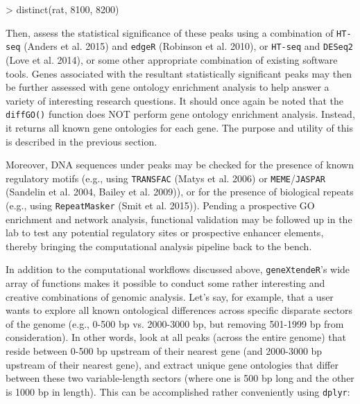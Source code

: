 \documentclass[12pt]{article}
\begin{document}
\begin{Schunk}
\begin{Sinput}
> distinct(rat, 8100, 8200)
\end{Sinput}
\end{Schunk}

Then, assess the statistical significance of these peaks using a combination of \texttt{HT-seq} (Anders et al. 2015) and \texttt{edgeR} (Robinson et al. 2010), or \texttt{HT-seq} and \texttt{DESeq2} (Love et al. 2014), or some other appropriate combination of existing software tools.  Genes associated with the resultant statistically significant peaks may then be further assessed with gene ontology enrichment analysis to help answer a variety of interesting research questions.  It should once again be noted that the \texttt{diffGO()} function does NOT perform gene ontology enrichment analysis.  Instead, it returns all known gene ontologies for each gene.  The purpose and utility of this is described in the previous section.

Moreover, DNA sequences under peaks may be checked for the presence of known regulatory motifs (e.g., using \texttt{TRANSFAC} (Matys et al. 2006) or \texttt{MEME}/\texttt{JASPAR} (Sandelin et al. 2004, Bailey et al. 2009)), or for the presence of biological repeats (e.g., using \texttt{RepeatMasker} (Smit et al. 2015)). Pending a prospective GO enrichment and network analysis, functional validation may be followed up in the lab to test any potential regulatory sites or prospective enhancer elements, thereby bringing the computational analysis pipeline back to the bench.

In addition to the computational workflows discussed above, \texttt{geneXtendeR}'s wide array of functions makes it possible to conduct some rather interesting and creative combinations of genomic analysis.  Let's say, for example, that a user wants to explore all known ontological differences across specific disparate sectors of the genome (e.g., 0-500 bp vs. 2000-3000 bp, but removing 501-1999 bp from consideration).  In other words, look at all peaks (across the entire genome) that reside between 0-500 bp upstream of their nearest gene (and 2000-3000 bp upstream of their nearest gene), and extract unique gene ontologies that differ between these two variable-length sectors (where one is 500 bp long and the other is 1000 bp in length).  This can be accomplished rather conveniently using \texttt{dplyr}:
\end{document}
